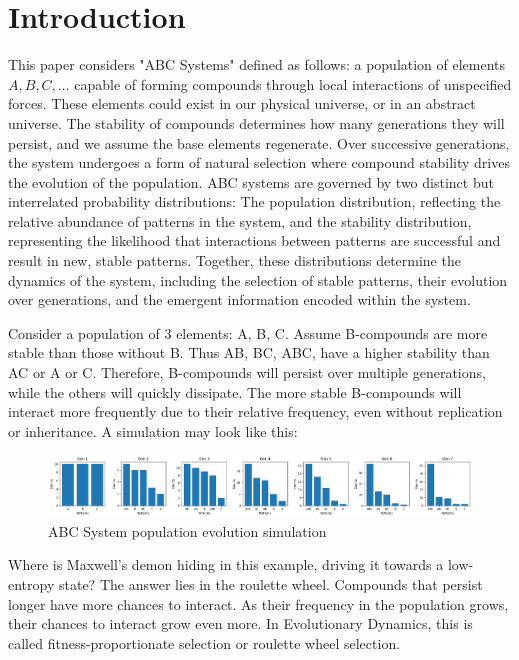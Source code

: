\documentclass[entropy,article,submit,pdftex,moreauthors]{Definitions/mdpi}
\begin{document}


\section{Introduction}

This paper considers "ABC Systems" defined as follows: a population of elements \( A, B, C, \dots \) capable of forming compounds through local interactions of unspecified forces. These elements could exist in our physical universe, or in an abstract universe. The stability of compounds determines how many generations they will persist, and we assume the base elements regenerate. Over successive generations, the system undergoes a form of natural selection where compound stability drives the evolution of the population. ABC systems are governed by two distinct but interrelated probability distributions: The population distribution, reflecting the relative abundance of patterns in the system, and the stability distribution, representing the likelihood that interactions between patterns are successful and result in new, stable patterns. Together, these distributions determine the dynamics of the system, including the selection of stable patterns, their evolution over generations, and the emergent information encoded within the system.

Consider a population of 3 elements: {A, B, C}. Assume B-compounds are more stable than those without B. Thus AB, BC, ABC, have a higher stability than AC or A or C. Therefore, B-compounds will persist over multiple generations, while the others will quickly dissipate. The more stable B-compounds will interact more frequently due to their relative frequency, even without replication or inheritance. A simulation may look like this:

\begin{figure}[htp]
    \centering
    \includegraphics[width=13cm]{pat_1}
    \caption{ABC System population evolution simulation}
    \label{fig:pat_1}
\end{figure}

Where is Maxwell's demon hiding in this example, driving it towards a low-entropy state? The answer lies in the roulette wheel. Compounds that persist longer have more chances to interact. As their frequency in the population grows, their chances to interact grow even more. In Evolutionary Dynamics, this is called fitness-proportionate selection or roulette wheel selection.
\end{document}
